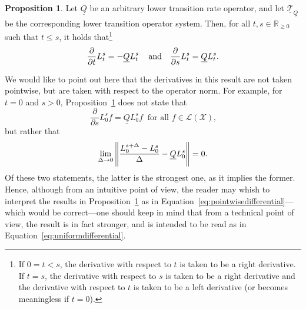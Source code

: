 \documentclass[10pt,a4paper]{paper}
\theoremstyle{definition}
\newtheorem{proposition}[theorem]{Proposition}
\newcommand{\reals}{\mathbb{R}}
\newcommand{\realsnonneg}{\reals_{\geq 0}}
\newcommand{\states}{\mathcal{X}}
\newcommand{\lbound}{L}
\newcommand{\gambles}{\mathcal{L}}
\newcommand{\gamblesX}{\gambles(\states)}
\newcommand{\lrate}{\underline{Q}}
\newcommand{\norm}[1]{\left\lVert #1 \right\rVert}
\begin{document}
\begin{proposition}\label{prop:lower_transition_has_deriv}
Let $\lrate$ be an arbitrary lower transition rate operator, and let $\underline{\mathcal{T}}_{\lrate}$ be the corresponding lower transition operator system. Then, for all $t,s\in\realsnonneg$ such that $t\leq s$, it holds that\footnote{If $0=t<s$, the derivative with respect to $t$ is taken to be a right derivative. If $t=s$, the derivative with respect to $s$ is taken to be a right derivative and the derivative with respect to $t$ is taken to be a left derivative (or becomes meaningless if $t=0$).}
\begin{equation*}
\frac{\partial}{\partial t}\lbound_t^s=-\lrate\lbound_t^s\,\quad\text{and}\quad\frac{\partial}{\partial s}\lbound_t^s=\lrate\lbound_t^s.\vspace{7pt}
\end{equation*}
\end{proposition}
We would like to point out here that the derivatives in this result are not taken pointwise, but are taken with respect to the operator norm. For example, for $t=0$ and $s>0$, Proposition~\ref{prop:lower_transition_has_deriv} does not state that
\begin{equation}\label{eq:pointwisedifferential}
\frac{\partial}{\partial s}\lbound_0^sf=\lrate\lbound_0^sf
~\text{ for all $f\in\gamblesX$,}
\end{equation}
but rather that
\begin{equation}\label{eq:uniformdifferential}
\lim_{\Delta\to0}
\norm{\frac{L_0^{s+\Delta}-L_0^s}{\Delta}-\lrate L_0^s}=0.\vspace{6pt}
\end{equation}
Of these two statements, the latter is the strongest one, as it implies the former. Hence, although from an intuitive point of view, the reader may whish to interpret the results in Proposition~\ref{prop:lower_transition_has_deriv} as in Equation~\eqref{eq:pointwisedifferential}---which would be correct---one should keep in mind that from a technical point of view, the result is in fact stronger, and is intended to be read as in Equation~\eqref{eq:uniformdifferential}.
\end{document}

